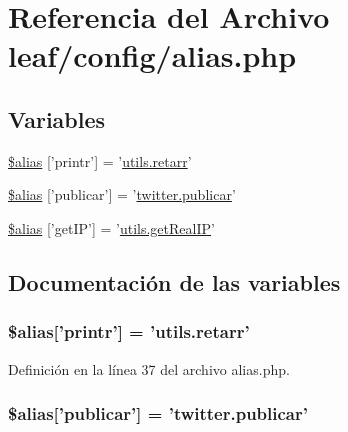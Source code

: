 \hypertarget{alias_8php}{\section{Referencia del Archivo leaf/config/alias.php}
\label{alias_8php}
}
\subsection*{Variables}
\begin{DoxyCompactItemize}
\item 
\hyperlink{alias_8php_aae0cdb810b98ef482568d966fc4dfcaf}{\$alias} \mbox{[}'printr'\mbox{]} = '\hyperlink{classutils_a9e4884d017bce3e122ca71e650c476a5}{utils.\-retarr}'
\item 
\hyperlink{alias_8php_a1be618a4b003fa6bcb8c1c23a57ea261}{\$alias} \mbox{[}'publicar'\mbox{]} = '\hyperlink{classtwitter_a03152964b365754fcf7e76902762da37}{twitter.\-publicar}'
\item 
\hyperlink{alias_8php_a72c9aa42fb63c2f6cff1c4dd5dabe89d}{\$alias} \mbox{[}'get\-I\-P'\mbox{]} = '\hyperlink{classutils_a0657599cdd55c01a672db6ca47939009}{utils.\-get\-Real\-I\-P}'
\end{DoxyCompactItemize}


\subsection{Documentación de las variables}
\hypertarget{alias_8php_aae0cdb810b98ef482568d966fc4dfcaf}{
\subsubsection[{\$alias}]{\setlength{\rightskip}{0pt plus 5cm}\$alias\mbox{[}'printr'\mbox{]} = '{\bf utils.\-retarr}'}}\label{alias_8php_aae0cdb810b98ef482568d966fc4dfcaf}


Definición en la línea 37 del archivo alias.\-php.

\hypertarget{alias_8php_a1be618a4b003fa6bcb8c1c23a57ea261}{
\subsubsection[{\$alias}]{\setlength{\rightskip}{0pt plus 5cm}\$alias\mbox{[}'publicar'\mbox{]} = '{\bf twitter.\-publicar}'}}\label{alias_8php_a1be618a4b003fa6bcb8c1c23a57ea261}


